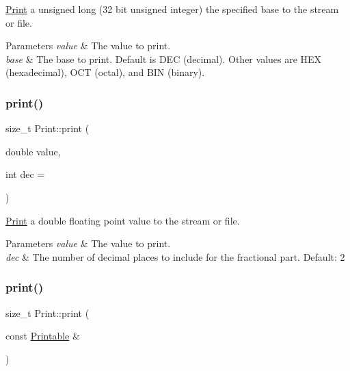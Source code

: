 \hyperlink{class_print}{Print} a unsigned long (32 bit unsigned integer) the specified base to the stream or file. 


\begin{DoxyParams}{Parameters}
{\em value} & The value to print. \\
\hline
{\em base} & The base to print. Default is D\+EC (decimal). Other values are H\+EX (hexadecimal), O\+CT (octal), and B\+IN (binary). \\
\hline
\end{DoxyParams}
\mbox{\label{class_print_ad89472bdb6539423a42d350beec02ff4}} 
\subsubsection{\texorpdfstring{print()}{print()}\hspace{0.1cm}{\footnotesize\ttfamily [17/19]}}
{\footnotesize\ttfamily size\+\_\+t Print\+::print (\begin{DoxyParamCaption}\item[{double}]{value,  }\item[{int}]{dec = {} }\end{DoxyParamCaption})}



\hyperlink{class_print}{Print} a double floating point value to the stream or file. 


\begin{DoxyParams}{Parameters}
{\em value} & The value to print. \\
\hline
{\em dec} & The number of decimal places to include for the fractional part. Default\+: 2 \\
\hline
\end{DoxyParams}
\mbox{\label{class_print_a901b0f06ae34aab31b8fbb4298f0596e}} 
\subsubsection{\texorpdfstring{print()}{print()}\hspace{0.1cm}{\footnotesize\ttfamily [18/19]}}
{\footnotesize\ttfamily size\+\_\+t Print\+::print (\begin{DoxyParamCaption}\item[{const \hyperlink{class_printable}{Printable} \&}]{ }\end{DoxyParamCaption})}



